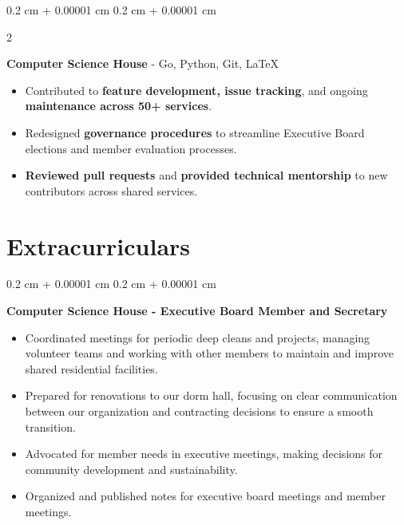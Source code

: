 \documentclass[10pt, letterpaper]{article}
\newenvironment{highlights}{
    \begin{itemize}[
        topsep=0.10 cm,
        parsep=0.10 cm,
        partopsep=0pt,
        itemsep=0pt,
        leftmargin=0.4 cm + 10pt
    ]
}{
    \end{itemize}
} %
\newenvironment{onecolentry}{
    \begin{adjustwidth}{
        0.2 cm + 0.00001 cm
    }{
        0.2 cm + 0.00001 cm
    }
}{
    \end{adjustwidth}
} %
\newenvironment{twocolentry}[2][]{
    \onecolentry
    \def\secondColumn{#2}
    \setcolumnwidth{\fill, 4.5 cm}
    \begin{paracol}{2}
}{
    \switchcolumn \raggedleft \secondColumn
    \end{paracol}
    \endonecolentry
} %
\let\hrefWithoutArrow\href
\renewcommand{\href}[2]{\hrefWithoutArrow{#1}{\ifthenelse{\equal{#2}{}}{ }{#2 }\raisebox{.15ex}{\footnotesize \faExternalLink*}}}
\begin{document}
\begin{twocolentry}{
    \hrefWithoutArrow{https://github.com/ComputerScienceHouse}{{\footnotesize\faGithub}\hspace*{0.13cm}{ComputerScienceHouse}}
}
    \textbf{Computer Science House} - Go, Python, Git, LaTeX
\end{twocolentry}
    \begin{highlights}
    \item Contributed to {\color{purple}\textbf{feature development, issue tracking}}, and ongoing {\color{purple}\textbf{maintenance across 50+ services}}.
    \item Redesigned {\color{purple}\textbf{governance procedures}} to streamline Executive Board elections and member evaluation processes.
    \item {\color{purple}\textbf{Reviewed pull requests}} and {\color{purple}\textbf{provided technical mentorship}} to new contributors across shared services.
\end{highlights}

\vspace{-0.2cm}
\endgroup
\section{\large\bfseries Extracurriculars}

        \begingroup


        
        \begin{onecolentry}
            \textbf{Computer Science House - Executive Board Member and Secretary} 
            \begin{highlights}
                \item Coordinated meetings for periodic deep cleans and projects, managing volunteer teams and working with other members to maintain and improve shared residential facilities.
                \item Prepared for renovations to our dorm hall, focusing on clear communication between our organization and contracting decisions to ensure a smooth transition.
                \item Advocated for member needs in executive meetings, making decisions for community development and sustainability.
                \item Organized and published notes for executive board meetings and member meetings.
            \end{highlights}
        \end{onecolentry}
\end{document}
